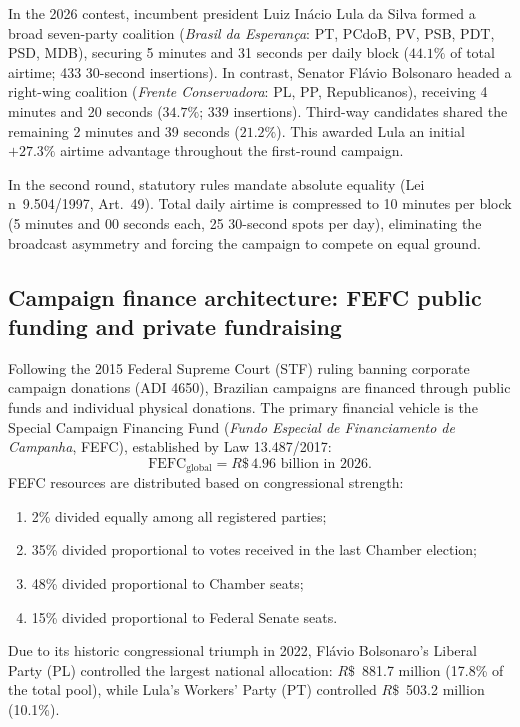 \documentclass[11pt,a4paper]{article}
\begin{document}
In the 2026 contest, incumbent president Luiz In{\'a}cio Lula da Silva formed a broad seven-party coalition (\emph{Brasil da Esperan{\c{c}}a}: PT, PCdoB, PV, PSB, PDT, PSD, MDB), securing 5 minutes and 31 seconds per daily block ($44.1\%$ of total airtime; 433 30-second insertions). In contrast, Senator Fl{\'a}vio Bolsonaro headed a right-wing coalition (\emph{Frente Conservadora}: PL, PP, Republicanos), receiving 4 minutes and 20 seconds ($34.7\%$; 339 insertions). Third-way candidates shared the remaining 2 minutes and 39 seconds ($21.2\%$). This awarded Lula an initial $+27.3\%$ airtime advantage throughout the first-round campaign.

In the second round, statutory rules mandate absolute equality (Lei n\textordmasculine~9.504/1997, Art.~49). Total daily airtime is compressed to 10 minutes per block (5 minutes and 00 seconds each, 25 30-second spots per day), eliminating the broadcast asymmetry and forcing the campaign to compete on equal ground.

\subsection{Campaign finance architecture: FEFC public funding and private fundraising}
\label{sssec:campaign_finance_details}
Following the 2015 Federal Supreme Court (STF) ruling banning corporate campaign donations (ADI 4650), Brazilian campaigns are financed through public funds and individual physical donations. The primary financial vehicle is the Special Campaign Financing Fund (\emph{Fundo Especial de Financiamento de Campanha}, FEFC), established by Law 13.487/2017:
\begin{equation}
    \mathrm{FEFC}_{\mathrm{global}} = R\$\,4.96 \text{ billion in 2026}.
    \label{eq:fefc_global}
\end{equation}
FEFC resources are distributed based on congressional strength:
\begin{enumerate}
    \item 2\% divided equally among all registered parties;
    \item 35\% divided proportional to votes received in the last Chamber election;
    \item 48\% divided proportional to Chamber seats;
    \item 15\% divided proportional to Federal Senate seats.
\end{enumerate}

Due to its historic congressional triumph in 2022, Fl{\'a}vio Bolsonaro's Liberal Party (PL) controlled the largest national allocation: $R\$$~881.7 million (17.8\% of the total pool), while Lula's Workers' Party (PT) controlled $R\$$~503.2 million (10.1\%).
\end{document}
